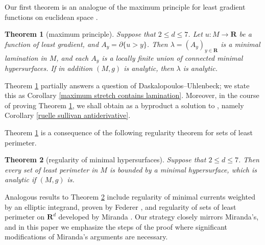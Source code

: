 \documentclass[reqno,12pt,letterpaper]{amsart}
\newcommand{\RR}{\mathbf{R}}
\newtheorem{theorem}{Theorem}[section]
\theoremstyle{definition}
\numberwithin{equation}{section}
\begin{document}
Our first theorem is an analogue of the maximum principle for least gradient functions on euclidean space \cite[Proposition 3.4]{górny2017planar}.

\begin{theorem}[maximum principle]\label{main thm}
Suppose that $2 \leq d \leq 7$.
Let $u: M \to \RR$ be a function of least gradient, and $A_y = \partial \{u > y\}$.
Then $\lambda = (A_y)_{y \in \RR}$ is a minimal lamination in $M$, and each $A_y$ is a locally finite union of connected minimal hypersurfaces.
If in addition $(M, g)$ is analytic, then $\lambda$ is analytic.
\end{theorem}

Theorem \ref{main thm} partially answers a question \cite[Problem 9.5]{daskalopoulos2020transverse} of Daskalopoulos--Uhlenbeck; we state this as Corollary \ref{maximum stretch contains lamination}.
Moreover, in the course of proving Theorem \ref{main thm}, we shall obtain as a byproduct a solution to \cite[Problem 9.7]{daskalopoulos2020transverse}, namely Corollary \ref{ruelle sullivan antiderivative}.

Theorem \ref{main thm} is a consequence of the following regularity theorem for sets of least perimeter.

\begin{theorem}[regularity of minimal hypersurfaces]\label{main lma}
Suppose that $2 \leq d \leq 7$.
Then every set of least perimeter in $M$ is bounded by a minimal hypersurface, which is analytic if $(M, g)$ is.
\end{theorem}

Analogous results to Theorem \ref{main lma} include regularity of minimal currents weighted by an elliptic integrand, proven by Federer \cite[\S5.3]{federer2014geometric}, and regularity of sets of least perimeter on $\RR^d$ developed by Miranda \cite{Miranda64, Miranda66, Miranda67}.
Our strategy closely mirrors Miranda's, and in this paper we emphasize the steps of the proof where significant modifications of Miranda's arguments are necessary.
\end{document}

